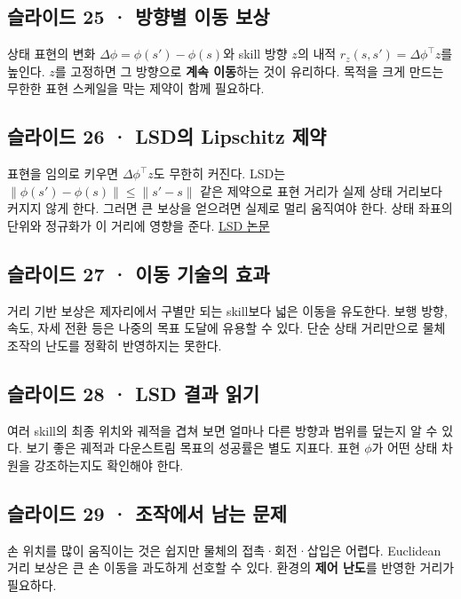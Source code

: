 \documentclass[11pt,a4paper]{article}
\begin{document}
\subsection{슬라이드 25 · 방향별 이동 보상}

상태 표현의 변화 $\Delta\phi=\phi(s')-\phi(s)$와 skill 방향 $z$의 내적 $r_z(s,s')=\Delta\phi^\top z$를 높인다. $z$를 고정하면 그 방향으로 \textbf{계속 이동}하는 것이 유리하다. 목적을 크게 만드는 무한한 표현 스케일을 막는 제약이 함께 필요하다.\par

\subsection{슬라이드 26 · LSD의 Lipschitz 제약}

표현을 임의로 키우면 $\Delta\phi^\top z$도 무한히 커진다. LSD는 $\|\phi(s')-\phi(s)\|\le\|s'-s\|$ 같은 제약으로 표현 거리가 실제 상태 거리보다 커지지 않게 한다. 그러면 큰 보상을 얻으려면 실제로 멀리 움직여야 한다. 상태 좌표의 단위와 정규화가 이 거리에 영향을 준다. \href{https://arxiv.org/abs/2202.00914}{LSD 논문}\par

\subsection{슬라이드 27 · 이동 기술의 효과}

거리 기반 보상은 제자리에서 구별만 되는 skill보다 넓은 이동을 유도한다. 보행 방향, 속도, 자세 전환 등은 나중의 목표 도달에 유용할 수 있다. 단순 상태 거리만으로 물체 조작의 난도를 정확히 반영하지는 못한다.\par

\subsection{슬라이드 28 · LSD 결과 읽기}

여러 skill의 최종 위치와 궤적을 겹쳐 보면 얼마나 다른 방향과 범위를 덮는지 알 수 있다. 보기 좋은 궤적과 다운스트림 목표의 성공률은 별도 지표다. 표현 $\phi$가 어떤 상태 차원을 강조하는지도 확인해야 한다.\par

\subsection{슬라이드 29 · 조작에서 남는 문제}

손 위치를 많이 움직이는 것은 쉽지만 물체의 접촉·회전·삽입은 어렵다. Euclidean 거리 보상은 큰 손 이동을 과도하게 선호할 수 있다. 환경의 \textbf{제어 난도}를 반영한 거리가 필요하다.\par
\end{document}
